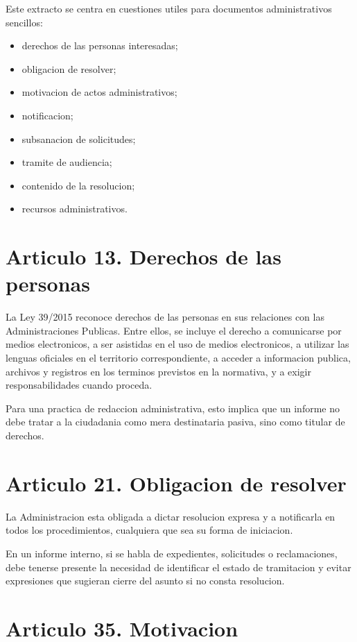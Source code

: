 \documentclass[a4paper,12pt]{article}
\begin{document}
Este extracto se centra en cuestiones utiles para documentos administrativos sencillos:

\begin{itemize}
    \item derechos de las personas interesadas;
    \item obligacion de resolver;
    \item motivacion de actos administrativos;
    \item notificacion;
    \item subsanacion de solicitudes;
    \item tramite de audiencia;
    \item contenido de la resolucion;
    \item recursos administrativos.
\end{itemize}

\section*{Articulo 13. Derechos de las personas}

La Ley 39/2015 reconoce derechos de las personas en sus relaciones con las Administraciones Publicas. Entre ellos, se incluye el derecho a comunicarse por medios electronicos, a ser asistidas en el uso de medios electronicos, a utilizar las lenguas oficiales en el territorio correspondiente, a acceder a informacion publica, archivos y registros en los terminos previstos en la normativa, y a exigir responsabilidades cuando proceda.

Para una practica de redaccion administrativa, esto implica que un informe no debe tratar a la ciudadania como mera destinataria pasiva, sino como titular de derechos.

\section*{Articulo 21. Obligacion de resolver}

La Administracion esta obligada a dictar resolucion expresa y a notificarla en todos los procedimientos, cualquiera que sea su forma de iniciacion.

En un informe interno, si se habla de expedientes, solicitudes o reclamaciones, debe tenerse presente la necesidad de identificar el estado de tramitacion y evitar expresiones que sugieran cierre del asunto si no consta resolucion.

\section*{Articulo 35. Motivacion}
\end{document}
